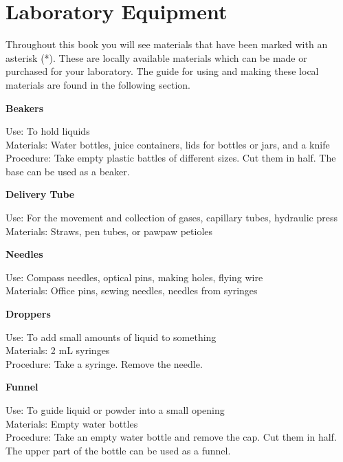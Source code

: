 \chapter{Laboratory Equipment}
Throughout this book you will see materials that have been marked with an asterisk (*). These are locally available materials which can be made or purchased for your laboratory. The guide for using and making these local materials are found in the following section.  

\begin{flushleft}
\textbf{Beakers}
\end{flushleft}
\vspace{-10pt}
Use: To hold liquids\\
Materials: Water bottles, juice containers, lids for bottles or jars, and a knife\\
Procedure: Take empty plastic battles of different sizes. Cut them in half. The base can be used as a beaker.  \\

\begin{flushleft}
\textbf{Delivery Tube}
\end{flushleft}
\vspace{-10pt}
Use: For the movement and collection of gases, capillary tubes, hydraulic press\\
Materials: Straws, pen tubes, or pawpaw petioles\\

\begin{flushleft}
\textbf{Needles}
\end{flushleft}
\vspace{-10pt}
Use: Compass needles, optical pins, making holes, flying wire\\
Materials: Office pins, sewing needles, needles from syringes\\

\begin{flushleft}
\textbf{Droppers}
\end{flushleft}
\vspace{-10pt}
Use: To add small amounts of liquid to something\\
Materials: 2 mL syringes\\
Procedure: Take a syringe. Remove the needle. \\

\begin{flushleft}
\textbf{Funnel}
\end{flushleft}
\vspace{-10pt}
Use: To guide liquid or powder into a small opening\\
Materials: Empty water bottles\\
Procedure: Take an empty water bottle and remove the cap. Cut them in half. The upper part of the bottle can be used as a funnel.  \\

